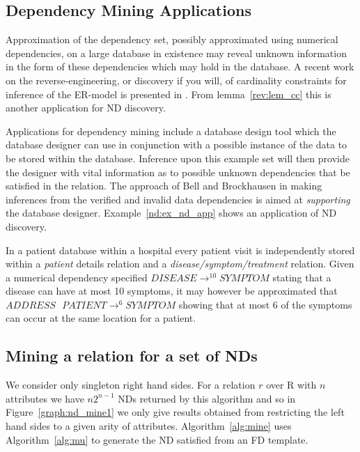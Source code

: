 \subsection{Dependency Mining Applications}\label{subsec:fd_jobs}
Approximation of the dependency set, possibly approximated using numerical
dependencies, on a large database in existence may reveal unknown information
in the form of these dependencies which may hold in the database. A
recent work on the reverse-engineering, or discovery if you will, of
cardinality constraints for inference of the ER-model is presented in
\cite{sou98}. From lemma~\ref{rev:lem_cc} this is another application
for ND discovery.

\smallskip

Applications for dependency mining include a database
design tool which the database designer can use in conjunction with a possible
instance of the data to be stored within the database.  Inference upon this 
example set will then provide the designer with vital information as to possible
unknown dependencies that be satisfied in the relation. The approach of 
Bell and Brockhausen \cite{bb95} in making inferences from the verified and
invalid data dependencies is aimed at {\em supporting} the database
designer. Example~\ref{nd:ex_nd_app} shows an application of ND discovery.


\begin{example}\label{nd:ex_nd_app}
\begin{rm}
In a patient database within a hospital every patient visit is
independently stored within a {\em patient} details relation and a {\em
disease/symptom/treatment} relation.  
Given a numerical dependency specified $DISEASE \to^{10} SYMPTOM$ stating
that a disease can have at most 10 symptoms, it may however be approximated
that $ADDRESS \: \: \: PATIENT \to^{6} SYMPTOM$ showing that at most
6 of the symptoms can occur at the same location for a patient.
\end{rm}
\end{example}


\subsection{Mining a relation for a set of NDs}

We consider only singleton right hand sides. For a relation $r$ over R with
$n$ attributes we have $n 2^{n-1}$ NDs returned by this algorithm and
so in Figure~\ref{graph:nd_mine1} we only give results obtained from
restricting the 
left hand sides to a given arity of 
attributes. Algorithm~\ref{alg:mine} uses Algorithm~\ref{alg:mu} to
generate the ND satisfied from an FD template.

